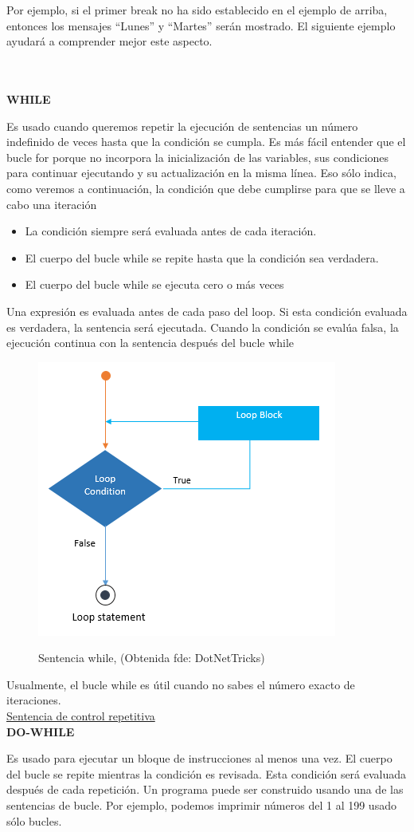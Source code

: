 \documentclass[11pt, letterpaper, spanish]{article}
\begin{document}
{{{\begin{itemize}
\end{itemize}
\par{Por ejemplo, si el primer break no ha sido establecido en el ejemplo de arriba, entonces los mensajes “Lunes” y “Martes” serán mostrado. El siguiente ejemplo ayudará a comprender mejor este aspecto.}}\\ \\
\textbf{WHILE}
\par{Es usado cuando queremos repetir la ejecución de sentencias un número indefinido de veces hasta que la condición se cumpla. Es más fácil entender que el bucle for porque no incorpora la inicialización de las variables, sus condiciones para continuar ejecutando y su actualización en la misma línea. Eso sólo indica, como veremos a continuación, la condición que debe cumplirse para que se lleve a cabo una iteración}
   \begin{itemize}
       \item La condición siempre será evaluada antes de cada iteración.
       \item El cuerpo del bucle while se repite hasta que la condición sea verdadera.
       \item El cuerpo del bucle while se ejecuta cero o más veces
   \end{itemize}
\par{Una expresión es evaluada antes de cada paso del loop. Si esta condición evaluada es verdadera, la sentencia será ejecutada. Cuando la condición se evalúa falsa, la ejecución continua con la sentencia después del bucle while}
\begin{figure}
	    \centering
		\caption{Sentencia while, (Obtenida fde: {DotNetTricks})}
		\includegraphics[width=0.2 \textwidth]{cloop.png}
		\label{Imagen_while}
	\end{figure}
	\par{Usualmente, el bucle while es útil cuando no sabes el número exacto de iteraciones.}\\
    \underline{Sentencia de control repetitiva }\\
\textbf{DO-WHILE}\\
\par{Es usado para ejecutar un bloque de instrucciones al menos una vez. El cuerpo del bucle se repite mientras la condición es revisada. Esta condición será evaluada después de cada repetición. Un programa puede ser construido usando una de las sentencias de bucle. Por ejemplo, podemos imprimir números del 1 al 199 usado sólo bucles.}\\ \\
}}
\end{document}
